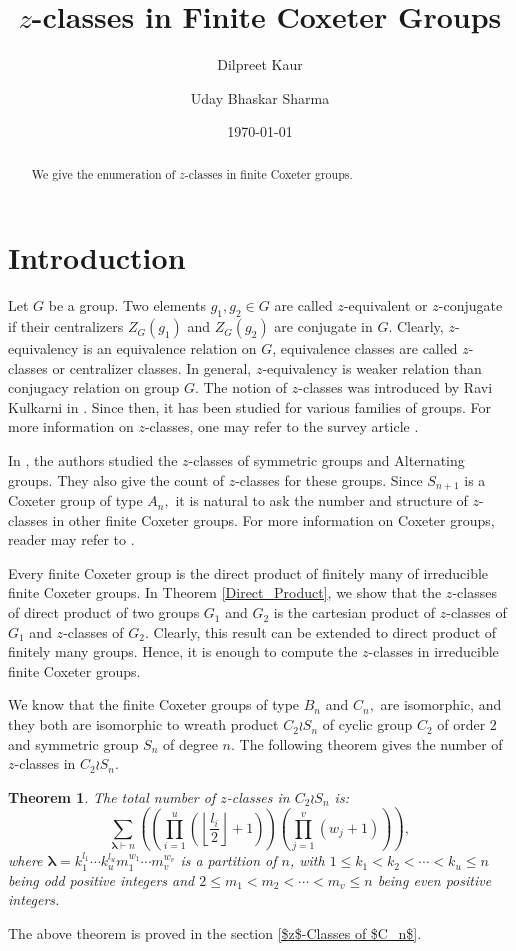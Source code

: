 \documentclass[12pt,twoside,reqno]{amsart}
\title[ $z$-Classes in Finite Coxeter Groups]{$z$-classes in Finite Coxeter Groups}
\author{Dilpreet Kaur}
\author{Uday Bhaskar Sharma}
\date{\today}
\newtheorem{theorem}{Theorem}[section]
\theoremstyle{definition}
\numberwithin{equation}{section}
\newcommand{\Lbd}{\bm {\lambda}}
\begin{document}
\setcounter{section}{0}
\begin{abstract}
We give the enumeration of $z$-classes in finite Coxeter groups. 
\end{abstract}
\maketitle
\section{Introduction}
Let $G$ be a group. Two elements $g_1,g_2\in G$ are called $z$-equivalent or $z$-conjugate if their centralizers $Z_G(g_1)$ and $Z_G(g_2)$ are conjugate in $G.$ Clearly, 
$z$-equivalency is an equivalence relation on $G$, equivalence classes are called $z$-classes or centralizer classes. In general, $z$-equivalency is weaker relation than conjugacy relation on group $G.$ The notion of $z$-classes was introduced by Ravi Kulkarni in \cite{RK:2007}. Since then, it has been studied for various families of groups. For more information on $z$-classes, one may refer to the survey article \cite{BS}.

In \cite{BKS:2019}, the authors studied the $z$-classes of symmetric groups and Alternating groups. They also give the count of $z$-classes for these groups. Since $S_{n+1}$ is a Coxeter group of type $A_n,$ it is natural to ask the number and structure of $z$-classes in other finite Coxeter groups. For more information on Coxeter groups, reader may refer to  \cite{Hum}.

Every finite Coxeter group is the direct product of finitely many of irreducible finite Coxeter groups. In Theorem \ref{Direct_Product}, we show that the $z$-classes of direct product of two groups $G_1$ and $G_2$ is the cartesian product of $z$-classes of $G_1$ and $z$-classes of $G_2.$ Clearly, this result can be extended to direct product of finitely many groups. Hence, it is enough to compute the $z$-classes in irreducible finite Coxeter groups.

 We know that the finite Coxeter groups of type $B_n$ and $C_n, $ are isomorphic, and they both are isomorphic to wreath product $C_2 \wr S_n$ of cyclic group $C_2$ of order $2$ and symmetric group $S_n$ of degree $n.$ The following theorem gives the number of $z$-classes in $C_2 \wr S_n.$
\begin{theorem}\label{ThMain1}
The total number of $z$-classes in $C_2 \wr S_n$ is:
\begin{equation}\label{Emain1}\sum_{{\Lbd} \vdash n}\left( \left(\prod_{i=1}^u \left(\left\lfloor \frac{l_i}{2}\right\rfloor + 1\right)\right)\left(\prod_{j=1}^v (w_j+1)\right)\right),\end{equation}
where ${\Lbd} = k_1^{l_1}\cdots k_u^{l_u}m_1^{w_1}\cdots m_v^{w_v}$ is a partition of $n$, with $1 \leq k_1 < k_2 < \cdots < k_u \leq n$ being odd positive integers and $2\leq m_1 < m_2 < \cdots <m_v \leq n$ being even positive integers.
\end{theorem}
The above theorem is proved in the section \ref{$z$-Classes of $C_n$}.
\end{document}
